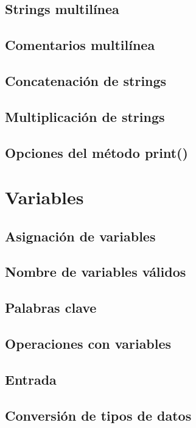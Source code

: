 \documentclass{article}
\begin{document}
\subsection{Strings multilínea}

\subsection{Comentarios multilínea}

\subsection{Concatenación de strings}

\subsection{Multiplicación de strings}

\subsection{Opciones del método print()}

\section{Variables}

\subsection{Asignación de variables}

\subsection{Nombre de variables válidos}

\subsection{Palabras clave}

\subsection{Operaciones con variables}

\subsection{Entrada}

\subsection{Conversión de tipos de datos}
\end{document}
